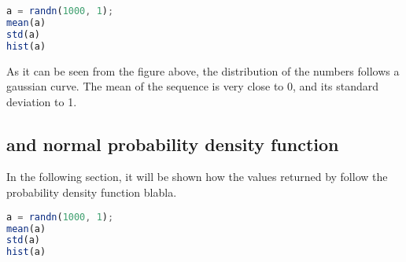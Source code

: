 \begin{lstlisting}[language=Octave]
a = randn(1000, 1);
mean(a)
std(a)
hist(a)
\end{lstlisting}

As it can be seen from the figure above, the distribution of the numbers follows a gaussian curve.
The mean of the sequence is very close to 0, and its standard deviation to 1.


\subsection{ and normal probability density function}
In the following section, it will be shown how the values returned by  follow the probability density function blabla.

\begin{lstlisting}[language=Octave]
a = randn(1000, 1);
mean(a)
std(a)
hist(a)
\end{lstlisting}
